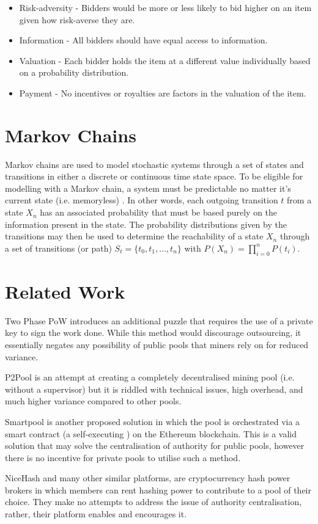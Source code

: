 \begin{itemize}
    \item Risk-adversity - Bidders would be more or less likely to bid higher on an item given how risk-averse they are.
    \item Information - All bidders should have equal access to information.
    \item Valuation - Each bidder holds the item at a different value individually based on a probability distribution.
    \item Payment - No incentives or royalties are factors in the valuation of the item.
\end{itemize}

\section{Markov Chains}

Markov chains are used to model stochastic systems through a set of states and transitions in either a discrete or continuous time state space. To be eligible for modelling with a Markov chain, a system must be predictable no matter it's current state (i.e. memoryless) \cite{karlin2012first}. In other words, each outgoing transition $t$ from a state $X_n$ has an associated probability that must be based purely on the information present in the state. The probability distributions given by the transitions may then be used to determine the reachability of a state $X_n$ through a set of transitions (or path) $S_t = \{t_0, t_1, \ldots, t_n\}$ with $P(X_n) = \prod_{i=0}^n P(t_i)$.

\section{Related Work}

Two Phase PoW \cite{bastiaan2015} introduces an additional puzzle that requires the use of a private key to sign the work done. While this method would discourage outsourcing, it essentially negates any possibility of public pools that miners rely on for reduced variance. 

P2Pool \cite{p2pool} is an attempt at creating a completely decentralised mining pool (i.e. without a supervisor) but it is riddled with technical issues, high overhead, and much higher variance compared to other pools. 

Smartpool \cite{smartpool2017} is another proposed solution in which the pool is orchestrated via a smart contract (a self-executing ) on the Ethereum blockchain. This is a valid solution that may solve the centralisation of authority for public pools, however there is no incentive for private pools to utilise such a method. 

NiceHash and many other similar platforms, are cryptocurrency hash power brokers in which members can rent hashing power to contribute to a pool of their choice. They make no attempts to address the issue of authority centralisation, rather, their platform enables and encourages it.

